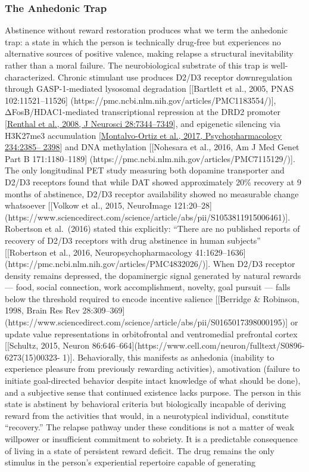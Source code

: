 \subsubsection{The Anhedonic Trap}\label{18_restoration-the-anhedonic-trap}

Abstinence without reward restoration produces what we term the anhedonic trap: a state in which the person is technically drug-free but experiences no alternative sources of positive valence, making relapse a structural inevitability rather than a moral failure. The neurobiological substrate of this trap is well-characterized. Chronic stimulant use produces D2/D3 receptor downregulation through GASP-1-mediated lysosomal degradation {[}{[}Bartlett et al., 2005, PNAS 102:11521--11526{]} (https://pmc.ncbi.nlm.nih.gov/articles/PMC1183554/){]}, ΔFosB/HDAC1-mediated transcriptional repression at the DRD2 promoter {[}\href{https://pubmed.ncbi.nlm.nih.gov/18632938/}{Renthal et al., 2008, J Neurosci 28:7344--7349}{]}, and epigenetic silencing via H3K27me3 accumulation {[}\href{https://pubmed.ncbi.nlm.nih.gov/28421257/}{Montalvo-Ortiz et al., 2017, Psychopharmacology 234:2385-- 2398}{]} and DNA methylation {[}{[}Nohesara et al., 2016, Am J Med Genet Part B 171:1180--1189{]} (https://pmc.ncbi.nlm.nih.gov/articles/PMC7115129/){]}. The only longitudinal PET study measuring both dopamine transporter and D2/D3 receptors found that while DAT showed approximately 20\% recovery at 9 months of abstinence, D2/D3 receptor availability showed no measurable change whatsoever {[}{[}Volkow et al., 2015, NeuroImage 121:20--28{]} (https://www.sciencedirect.com/science/article/abs/pii/S1053811915006461){]}. Robertson et al.~(2016) stated this explicitly: ``There are no published reports of recovery of D2/D3 receptors with drug abstinence in human subjects'' {[}{[}Robertson et al., 2016, Neuropsychopharmacology 41:1629--1636{]} (https://pmc.ncbi.nlm.nih.gov/articles/PMC4832026/){]}. When D2/D3 receptor density remains depressed, the dopaminergic signal generated by natural rewards --- food, social connection, work accomplishment, novelty, goal pursuit --- falls below the threshold required to encode incentive salience {[}{[}Berridge \& Robinson, 1998, Brain Res Rev 28:309--369{]} (https://www.sciencedirect.com/science/article/abs/pii/S0165017398000195){]} or update value representations in orbitofrontal and ventromedial prefrontal cortex {[}{[}Schultz, 2015, Neuron 86:646--664{]}(https://www.cell.com/neuron/fulltext/S0896-6273(15)00323- 1){]}. Behaviorally, this manifests as anhedonia (inability to experience pleasure from previously rewarding activities), amotivation (failure to initiate goal-directed behavior despite intact knowledge of what should be done), and a subjective sense that continued existence lacks purpose. The person in this state is abstinent by behavioral criteria but biologically incapable of deriving reward from the activities that would, in a neurotypical individual, constitute ``recovery.'' The relapse pathway under these conditions is not a matter of weak willpower or insufficient commitment to sobriety. It is a predictable consequence of living in a state of persistent reward deficit. The drug remains the only stimulus in the person's experiential repertoire capable of generating 